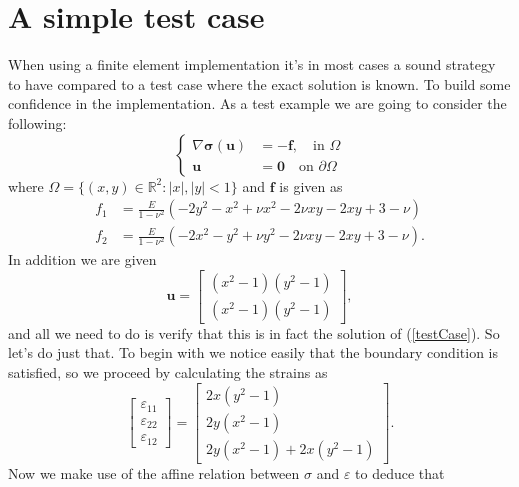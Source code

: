 \documentclass[paper=a4, fontsize=11pt]{scrartcl} %
\begin{document}
\section*{A simple test case}
When using a finite element implementation it's in most cases a sound strategy to have compared to a test case where the exact solution is known. To build some confidence in the implementation. As a test example we are going to consider the following:
\begin{equation}
\label{testCase}
\begin{cases}\nabla \boldsymbol{\sigma}(\boldsymbol{u}) &= -\boldsymbol{f}, \quad \text{in } \Omega \\
\boldsymbol{u} &= \boldsymbol{0} \quad \text{on } \partial \Omega
\end{cases}
\end{equation}
where $\Omega = \{(x,y)\in \mathbb{R}^2: |x|,|y|<1\}$ and $\boldsymbol{f}$ is given as
\begin{align*}
f_1 &= \frac{E}{1-\nu^2}\left(-2y^2-x^2+\nu x^2-2\nu xy - 2xy + 3 - \nu\right) \\
f_2 &= \frac{E}{1-\nu^2}\left(-2x^2-y^2+\nu y^2-2\nu xy - 2xy + 3 - \nu\right).
\end{align*}
In addition we are given
\begin{equation*}
\boldsymbol{u} = \begin{bmatrix}
(x^2-1)(y^2-1) \\ (x^2-1)(y^2-1)
\end{bmatrix},
\end{equation*}
and all we need to do is verify that this is in fact the solution of (\ref{testCase}). So let's do just that. To begin with we notice easily that the boundary condition is satisfied, so we proceed by calculating the strains as
\begin{equation*}
\begin{bmatrix}
\varepsilon_{11} \\
\varepsilon_{22} \\
\varepsilon_{12}
\end{bmatrix}
=
\begin{bmatrix}
2x(y^2-1) \\
2y(x^2-1) \\
2y(x^2-1)+2x(y^2-1)
\end{bmatrix}.
\end{equation*}
Now we make use of the affine relation between $\sigma$ and $\varepsilon$ to deduce that
\end{document}
